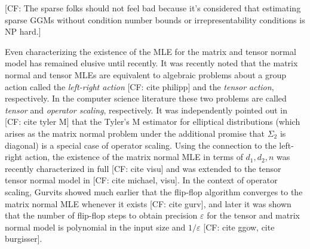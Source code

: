 \documentclass{article}
\newcommand\eps{\varepsilon}
\newcommand{\CF}[1]{{\color{purple}[CF: #1]}}
\begin{document}
\CF{The sparse folks should not feel bad because it's considered that estimating sparse GGMs without condition number bounds or irrepresentability conditions is NP hard.}



Even characterizing the existence of the MLE for the matrix and tensor normal model has remained elusive until recently. It was recently noted that the matrix normal and tensor MLEs are equivalent to algebraic problems about a group action called the \emph{left-right action} \CF{cite philipp} and the \emph{tensor action}, respectively. In the computer science literature these two problems are called \emph{tensor} and \emph{operator scaling}, respectively. It was independently pointed out in \CF{cite tyler M} that the Tyler's M estimator for elliptical distributions (which arises as the matrix normal problem under the additional promise that $\Sigma_2$ is diagonal) is a special case of operator scaling. Using the connection to the left-right action, the existence of the matrix normal MLE in terms of $d_1,d_2,n$ was recently characterized in full \CF{cite visu} and was extended to the tensor tensor normal model in \CF{cite michael, visu}. In the context of operator scaling, Gurvits showed much earlier that the flip-flop algorithm converges to the matrix normal MLE whenever it exists \CF{cite gurv}, and later it was shown that the number of flip-flop steps to obtain precision $\eps$ for the tensor and matrix normal model is polynomial in the input size and $1/\eps$ \CF{cite ggow, cite burgisser}. 

\end{document}
